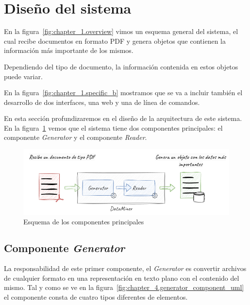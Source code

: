 \section{Diseño del sistema}\label{sec:Diseño del sistema}

En la figura~\ref{fig:chapter_1.overview} vimos un esquema general del sistema, el cual recibe documentos en formato
PDF y genera objetos que contienen la información más importante de los mismos.

Dependiendo del tipo de documento, la información contenida en estos objetos puede variar.

En la figura~\ref{fig:chapter_1.specific_b} mostramos que se va a incluir también el desarrollo de dos interfaces, una
web y una de línea de comandos.

En esta sección profundizaremos en el diseño de la arquitectura de este sistema.
En la figura~\ref{fig:chapter_4.overview} vemos que el sistema tiene dos componentes principales: el componente
\textit{Generator} y el componente \textit{Reader}.

\begin{figure}[ht]
    \begin{center}
        \includegraphics[width=\textwidth]{./chapter/4/images/chapter_4.overview}
        \caption{Esquema de los componentes principales}
        \label{fig:chapter_4.overview}
    \end{center}
\end{figure}

\subsection*{Componente \textit{Generator}}\label{subsec:chapter_4.generator_component}

La responsabilidad de este primer componente, el \textit{Generator} es convertir archivos de cualquier formato en una
representación en texto plano con el contenido del mismo.
Tal y como se ve en la figura~\ref{fig:chapter_4.generator_component_uml} el componente consta de cuatro tipos
diferentes de elementos.

